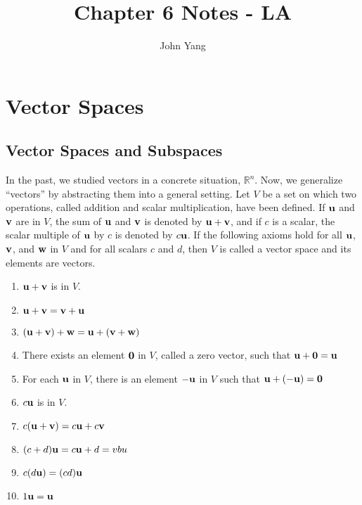 \documentclass{article}
\title{Chapter 6 Notes - LA} %
\author{John Yang}
\begin{document}
    \maketitle
    \tableofcontents
    \section{Vector Spaces}
    \subsection{Vector Spaces and Subspaces}
    \begin{outline}
        \1 In the past, we studied vectors in a concrete situation, \(\mathbb R^n\). Now, we generalize ``vectors'' by abstracting them into a general setting. 
        \1 Let $V$ be a set on which two operations, called addition and scalar multiplication, have been defined. If \(\vb u\) and \(\vb v\) are in $V$, the sum of \(\vb u\) and \(\vb v\) is denoted by \(\vb u+\vb v\), and if $c$ is a scalar, the scalar multiple of $\vb u$ by $c$ is denoted by \(c\vb u\). If the following axioms hold for all \(\vb u\), \(\vb v\), and \(\vb w\) in $V$ and for all scalars \(c\) and \(d\), then $V$ is called a vector space and its elements are vectors. 
    \end{outline}
    \begin{enumerate}
        \item \(\vb u+\vb v\) is in $V$. 
        \item \(\vb u+\vb v=\vb v+\vb u\)
        \item \((\vb u+\vb v)+\vb w=\vb u+(\vb v+\vb w)\)
        \item There exists an element $\vb 0$ in $V$, called a zero vector, such that \(\vb u+\vb 0=\vb u\)
        \item For each \(\vb u\) in $V$, there is an element \(-\vb u\) in $V$ such that \(\vb u+(-\vb u)=\vb 0\)
        \item \(c\vb u\) is in $V$. 
        \item \(c(\vb u+\vb v)=c\vb u+c\vb v\)
        \item \((c+d)\vb u=c\vb u+d=vb u\)
        \item \(c(d\vb u)=(cd)\vb u\)
        \item \(1\vb u=\vb u\)
    \end{enumerate}
\end{document}
